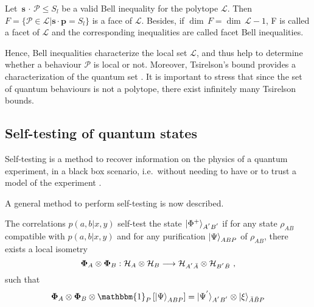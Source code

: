 \begin{definition}
Let $\, \mathbf{s}\,\cdot\,\mathcal{P} \leq S_l$ be a valid Bell inequality for the polytope 
$\mathcal{L}$. Then $F = \{ \mathcal{P}\in \mathcal{L}|\mathbf{s}\cdot \mathbf{p} = S_l\}$ 
is a face of $\mathcal{L}$. Besides, if $\dim\,F = \dim\, \mathcal{L} - 1 $, F is called a facet
of $\mathcal{L}$ and the corresponding inequalities are called facet Bell inequalities. 
\end{definition}


Hence, Bell inequalities characterize the local set
$\mathcal{L}$, and thus help to determine whether a behaviour $\mathcal{P}$ is local or not.
Moreover, Tsirelson's bound provides a characterization of the quantum set
\cite{cirelson_quantum_1980}. It is important to stress that since the set of quantum behaviours
is not a polytope, there exist infinitely many Tsirelson bounds.

\subsection{Self-testing of quantum states}

Self-testing is a method to recover information on the physics of a quantum experiment, in a black box scenario, i.e.\ without needing to have or to trust a model of the experiment \cite{2020-self-testing-a-review}.

A general method to perform self-testing is now described.

\begin{definition}
The correlations $p(a,b|x,y)$ self-test the state $\ket{\Phi^+}_{A^{'}B^{'}}$ if for any 
state $\rho_{AB}$ compatible with $p(a,b|x,y)$ and for any purification $\ket{\Psi}_{ABP}$ of 
$\rho_{AB}$, there exists a local isometry 
\begin{equation*}
    \mathbf{\Phi}_A \otimes \mathbf{\Phi}_B : \mathcal{H}_A \otimes \mathcal{H}_B 
    \longrightarrow \mathcal{H}_{A^{'}\Bar{A} } \otimes \mathcal{H}_{B^{'}\Bar{B}} \text{ ,}
\end{equation*}
such that 
\begin{equation}
    \mathbf{\Phi}_A \otimes \mathbf{\Phi}_B \otimes \mathbbm{1}_P  \left[  \ket{\Psi}_{ABP}
    \right] =  \ket{\Psi^{'}}_{A^{'}B^{'}} \otimes \ket{\xi}_{\Bar{A}\Bar{B}P}  
\end{equation}
\label{prop:self-test_states} 
\end{definition}

